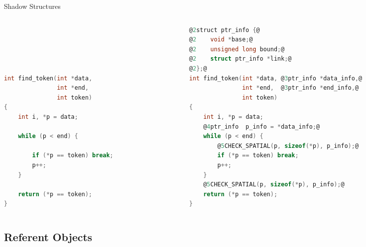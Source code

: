 \documentclass[aspectratio=169]{beamer}
\begin{document}
\begin{frame}[fragile]{Shadow Structures}
\begin{columns}
\begin{column}{0.48\textwidth}
\begin{lstlisting}[language=C,mathescape,basicstyle={\tiny\ttfamily}]





int find_token(int *data,
               int *end,
               int token)
{
    int i, *p = data;

    while (p < end) {

        if (*p == token) break;
        p++;
    }

    return (*p == token);
}
\end{lstlisting}
\end{column}

\pause

\begin{column}{0.48\textwidth}

\begin{lstlisting}[language=C,mathescape,basicstyle={\tiny\ttfamily},
    moredelim={**[is][{\btHL<2>}]{@2}{@}},
    moredelim={**[is][{\btHL<3>}]{@3}{@}},
    moredelim={**[is][{\btHL<4>}]{@4}{@}},
    moredelim={**[is][{\btHL<5>}]{@5}{@}},
]
@2struct ptr_info {@
@2    void *base;@
@2    unsigned long bound;@
@2    struct ptr_info *link;@
@2};@
int find_token(int *data, @3ptr_info *data_info,@
               int *end,  @3ptr_info *end_info,@
               int token)
{
    int i, *p = data;
    @4ptr_info  p_info = *data_info;@
    while (p < end) {
        @5CHECK_SPATIAL(p, sizeof(*p), p_info);@
        if (*p == token) break;
        p++;
    }
    @5CHECK_SPATIAL(p, sizeof(*p), p_info);@
    return (*p == token);
}
\end{lstlisting}
    \end{column}
  \end{columns}
\end{frame}


\subsection{Referent Objects}
\end{document}
